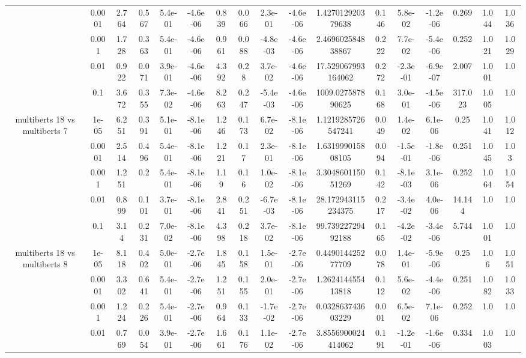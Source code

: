 \begin{tabular}{|c|c|c|c|c|c|c|c|c|c|c|c|c|c|c|c|c|}
 & 0.0001 & 2.764 & 0.567 & 5.4e-01 & -4.6e-06 & 0.839 & 0.066 & 2.3e-01 & -4.6e-06 & 1.427012920379638 & 0.146 & 5.8e-02 & -1.2e-06 & 0.269 & 1.044 & 1.036 \\
 & 0.001 & 1.728 & 0.363 & 5.4e-01 & -4.6e-06 & 0.961 & 0.088 & -4.8e-03 & -4.6e-06 & 2.469602584838867 & 0.222 & 7.7e-02 & -5.4e-06 & 0.252 & 1.021 & 1.029 \\
 & 0.01 & 0.922 & 0.071 & 3.9e-01 & -4.6e-06 & 4.392 & 0.28 & 3.7e-02 & -4.6e-06 & 17.529067993164062 & 0.272 & -2.3e-01 & -6.9e-07 & 2.007 & 1.001 & 1.0 \\
 & 0.1 & 3.672 & 0.355 & 7.3e-02 & -4.6e-06 & 8.263 & 0.247 & -5.4e-03 & -4.6e-06 & 1009.027587890625 & 0.168 & 3.0e-01 & -4.5e-06 & 317.023 & 1.005 & 1.0 \\
\hline
\multirow{5}{*}{multiberts 18 vs multiberts 7} & 1e-05 & 6.251 & 0.391 & 5.1e-01 & -8.1e-06 & 1.246 & 0.173 & 6.7e-02 & -8.1e-06 & 1.1219285726547241 & 0.049 & 1.4e-02 & 6.1e-06 & 0.25 & 1.041 & 1.012 \\
 & 0.0001 & 2.514 & 0.496 & 5.4e-01 & -8.1e-06 & 1.221 & 0.17 & 2.3e-01 & -8.1e-06 & 1.631999015808105 & 0.094 & -1.5e-01 & -1.8e-06 & 0.251 & 1.045 & 1.03 \\
 & 0.001 & 1.251 & 0.2 & 5.4e-01 & -8.1e-06 & 1.19 & 0.16 & 1.0e-02 & -8.1e-06 & 3.304860115051269 & 0.142 & -8.1e-03 & 3.1e-06 & 0.252 & 1.064 & 1.054 \\
 & 0.01 & 0.899 & 0.101 & 3.7e-01 & -8.1e-06 & 2.841 & 0.251 & -6.7e-03 & -8.1e-06 & 28.172943115234375 & 0.217 & -3.4e-02 & 4.0e-06 & 14.144 & 1.0 & 1.0 \\
 & 0.1 & 3.14 & 0.231 & 7.0e-02 & -8.1e-06 & 4.398 & 0.218 & 3.7e-02 & -8.1e-06 & 99.73922729492188 & 0.165 & -4.2e-02 & -3.4e-06 & 5.744 & 1.001 & 1.0 \\
\hline
\multirow{5}{*}{multiberts 18 vs multiberts 8} & 1e-05 & 8.118 & 0.402 & 5.0e-01 & -2.7e-06 & 1.845 & 0.158 & 1.5e-01 & -2.7e-06 & 0.449014425277709 & 0.078 & 1.4e-01 & -5.9e-06 & 0.25 & 1.06 & 1.051 \\
 & 0.0001 & 3.302 & 0.641 & 5.4e-01 & -2.7e-06 & 1.251 & 0.155 & 2.0e-01 & -2.7e-06 & 1.262414455413818 & 0.112 & 5.6e-02 & -4.4e-06 & 0.251 & 1.082 & 1.033 \\
 & 0.001 & 1.224 & 0.226 & 5.4e-01 & -2.7e-06 & 0.964 & 0.133 & -1.7e-02 & -2.7e-06 & 0.032863743603229 & 0.001 & 6.5e-02 & 7.1e-06 & 0.252 & 1.0 & 1.0 \\
 & 0.01 & 0.769 & 0.054 & 3.9e-01 & -2.7e-06 & 1.661 & 0.176 & 1.1e-02 & -2.7e-06 & 3.8556900024414062 & 0.191 & -1.2e-01 & -1.6e-06 & 0.334 & 1.003 & 1.0 \\

\end{tabular}
